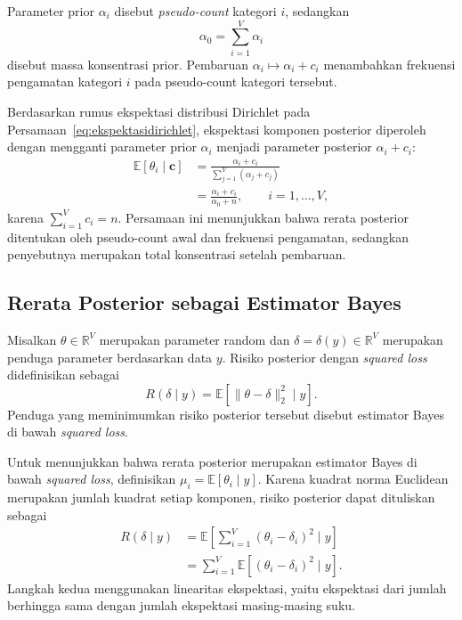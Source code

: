 \begin{definisi}
\label{def:pseudocount}
Parameter prior $\alpha_i$ disebut \textit{pseudo-count} kategori
$i$, sedangkan
\[
\alpha_0=\sum_{i=1}^{V}\alpha_i
\]
disebut massa konsentrasi prior. Pembaruan
$\alpha_i\mapsto\alpha_i+c_i$ menambahkan frekuensi pengamatan
kategori $i$ pada pseudo-count kategori tersebut.
\end{definisi}

Berdasarkan rumus ekspektasi distribusi Dirichlet pada
Persamaan~\eqref{eq:ekspektasidirichlet}, ekspektasi komponen
posterior diperoleh dengan mengganti parameter prior
$\alpha_i$ menjadi parameter posterior $\alpha_i+c_i$:
\begin{align}
\mathbb{E}[\theta_i\mid\bm{c}]
&=
\frac{\alpha_i+c_i}
{\sum_{j=1}^{V}(\alpha_j+c_j)}
\nonumber\\
&=
\frac{\alpha_i+c_i}{\alpha_0+n},
\qquad i=1,\ldots,V,
\label{eq:ekspektasiposterior}
\end{align}
karena $\sum_{i=1}^{V}c_i=n$. Persamaan ini menunjukkan bahwa
rerata posterior ditentukan oleh pseudo-count awal dan frekuensi
pengamatan, sedangkan penyebutnya merupakan total konsentrasi
setelah pembaruan.

\subsection{Rerata Posterior sebagai Estimator Bayes}
\label{subsec:estimatorbayes}

\begin{definisi}
\label{def:risikokuadratik}
Misalkan $\theta\in\mathbb{R}^{V}$ merupakan parameter random
dan $\delta=\delta(y)\in\mathbb{R}^{V}$ merupakan penduga
parameter berdasarkan data $y$. Risiko posterior dengan \textit{squared loss} didefinisikan sebagai
\begin{equation}
R(\delta\mid y)
=
\mathbb{E}\left[
\lVert\theta-\delta\rVert_2^2
\mid y
\right].
\label{eq:risikokuadratik}
\end{equation}
Penduga yang meminimumkan risiko posterior tersebut disebut
estimator Bayes di bawah \textit{squared loss}.
\end{definisi}

Untuk menunjukkan bahwa rerata posterior merupakan estimator
Bayes di bawah \textit{squared loss}, definisikan
$\mu_i=\mathbb{E}[\theta_i\mid y]$. Karena kuadrat norma
Euclidean merupakan jumlah kuadrat setiap komponen, risiko
posterior dapat dituliskan sebagai
\begin{align}
R(\delta\mid y)
&=
\mathbb{E}\left[
\sum_{i=1}^{V}(\theta_i-\delta_i)^2
\mid y
\right]
\nonumber\\
&=
\sum_{i=1}^{V}
\mathbb{E}\left[
(\theta_i-\delta_i)^2\mid y
\right].
\label{eq:risikokomponen}
\end{align}
Langkah kedua menggunakan linearitas ekspektasi, yaitu
ekspektasi dari jumlah berhingga sama dengan jumlah ekspektasi
masing-masing suku.

